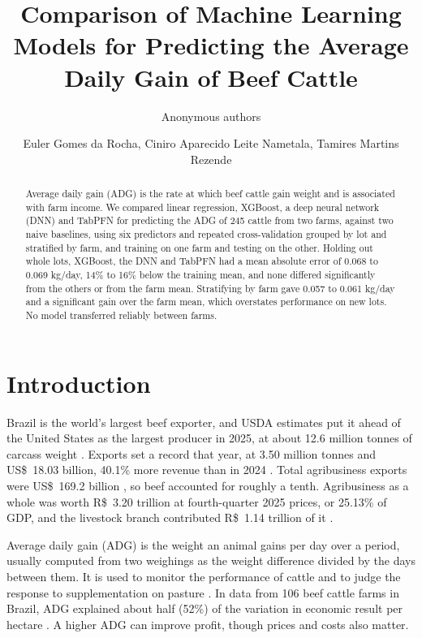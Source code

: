\documentclass[12pt]{article}
\title{Comparison of Machine Learning Models for Predicting the Average Daily Gain of Beef Cattle}
\author{Anonymous authors\inst{1}}
\author{Euler Gomes da Rocha\inst{1}, Ciniro Aparecido Leite Nametala\inst{1}, Tamires Martins Rezende\inst{2}}
\begin{document}
\maketitle

\begin{abstract}
Average daily gain (ADG) is the rate at which beef cattle gain weight and is associated with farm income. We compared linear regression, XGBoost, a deep neural network (DNN) and TabPFN for predicting the ADG of 245 cattle from two farms, against two naive baselines, using six predictors and repeated cross-validation grouped by lot and stratified by farm, and training on one farm and testing on the other. Holding out whole lots, XGBoost, the DNN and TabPFN had a mean absolute error of 0.068 to 0.069 kg/day, 14\% to 16\% below the training mean, and none differed significantly from the others or from the farm mean. Stratifying by farm gave 0.057 to 0.061 kg/day and a significant gain over the farm mean, which overstates performance on new lots. No model transferred reliably between farms.
\end{abstract}

\section{Introduction}

Brazil is the world's largest beef exporter, and USDA estimates put it ahead of the United States as the largest producer in 2025, at about 12.6 million tonnes of carcass weight \cite{usda2025}. Exports set a record that year, at 3.50 million tonnes and US\$~18.03 billion, 40.1\% more revenue than in 2024 \cite{abiec2026}. Total agribusiness exports were US\$~169.2 billion \cite{insper2026exportacoes}, so beef accounted for roughly a tenth. Agribusiness as a whole was worth R\$~3.20 trillion at fourth-quarter 2025 prices, or 25.13\% of GDP, and the livestock branch contributed R\$~1.14 trillion of it \cite{cepea2026}.

Average daily gain (ADG) is the weight an animal gains per day over a period, usually computed from two weighings as the weight difference divided by the days between them. It is used to monitor the performance of cattle \cite{carvalho2017} and to judge the response to supplementation on pasture \cite{tambara2021}. In data from 106 beef cattle farms in Brazil, ADG explained about half (52\%) of the variation in economic result per hectare \cite{semchechem2021}. A higher ADG can improve profit, though prices and costs also matter.
\end{document}
